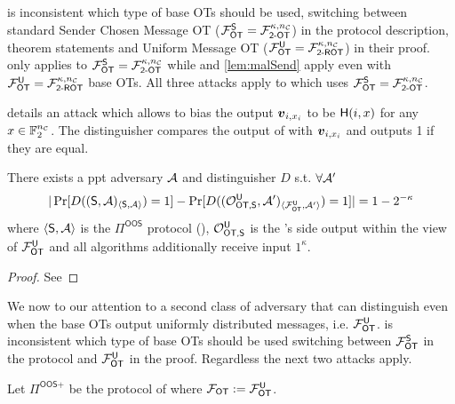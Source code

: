 \iffullversion
\begin{remark}\label{remark:oosROT}
	\cite{RSA:OrrOrsSch17} is inconsistent which type of base OTs should be used, switching between standard Sender Chosen Message OT ($\mathcal{F}_{\mathsf{OT}}^\mathsf{S}=\mathcal{F}^{\kappa,{n_\mathcal{C}}}_{\textsf{2-OT}}$) in the protocol description, theorem statements and Uniform Message OT ($\mathcal{F}_{\mathsf{OT}}^\mathsf{U}=\mathcal{F}^{\kappa,{n_\mathcal{C}}}_{\textsf{2-ROT}}$) in their proof.  only applies to $\mathcal{F}_{\mathsf{OT}}^\mathsf{S}=\mathcal{F}^{\kappa,{n_\mathcal{C}}}_{\textsf{2-OT}}$ while  and \ref{lem:malSend} apply even with $\mathcal{F}_{\mathsf{OT}}^\mathsf{U}=\mathcal{F}^{\kappa,{n_\mathcal{C}}}_{\textsf{2-ROT}}$ base OTs. All three attacks apply to \cite{C:KelOrsSch15} which uses $\mathcal{F}_{\mathsf{OT}}^\mathsf{S}=\mathcal{F}^{\kappa,{n_\mathcal{C}}}_{\textsf{2-OT}}$.
\end{remark}
\fi


 details an attack which allows \R to bias the output $\boldsymbol{v}_{i,x_i}$ to be $\mathsf{H}(i,x)$ for any $x\in\mathbb{F}^{{n_\mathcal{C}}}_2$. The distinguisher compares the output of \send with $\boldsymbol{v}_{i,x_i}$ and outputs 1 if they are equal. 


\begin{lemma} \label{lem:malRec}
	There exists a ppt adversary $\mathcal{A}$ and distinguisher $D$ s.t. $\forall\mathcal{A}'$ 
	$$
	|\Pr[D((\mathsf{S}, \mathcal{A})_{\langle\mathsf{S}, \mathcal{A}\rangle})=1]-\Pr[D((\mathcal{O}^{\mathsf{U}}_{\textsf{OT,\ensuremath{\mathsf{S}}}}, \mathcal{A}')_{\langle\mathcal{F}_{\mathsf{OT}}^\mathsf{U}, \mathcal{A}'\rangle})=1]|=1-2^{-\kappa}
	$$
	where $\langle\mathsf{S}, \mathcal{A}\rangle$ is the $\Pi^{\textsf{OOS}}$ protocol (), $\mathcal{O}^{\mathsf{U}}_{\textsf{OT,\ensuremath{\mathsf{S}}}}$ is the \send's side output within the view of $\mathcal{F}_{\mathsf{OT}}^{\mathsf{U}}$ and all algorithms additionally receive input $1^\kappa$. 
\end{lemma}
\iffullversion

\else
\begin{proof}
	See 
\end{proof}
\fi




We now to our attention to a second class of adversary that can distinguish even when the base OTs output uniformly distributed messages, i.e. $\mathcal{F}_{\mathsf{OT}}^\mathsf{U}$. %
\cite{RSA:OrrOrsSch17} is inconsistent which type of base OTs should be used switching between $\mathcal{F}_{\mathsf{OT}}^\mathsf{S}$ in the protocol and $\mathcal{F}_{\mathsf{OT}}^\mathsf{U}$ in the proof. Regardless the next two attacks apply. 

\begin{definition}\label{def:OOS2}
	Let $\Pi^{\textsf{OOS+}}$ be the protocol of  where $\mathcal{F}_{\mathsf{OT}}:=\mathcal{F}_{\mathsf{OT}}^\mathsf{U}$.
\end{definition}


